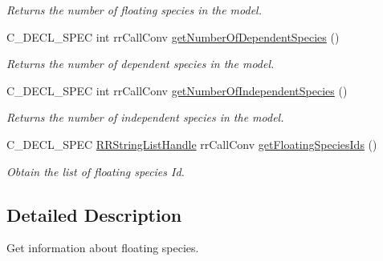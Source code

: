 \begin{DoxyCompactItemize}
\begin{DoxyCompactList}\small\item\em \-Returns the number of floating species in the model. \end{DoxyCompactList}\item 
\hypertarget{group__utility_ga7d573d16a02b3bf4361c00065f624e0b}{
\-C\-\_\-\-D\-E\-C\-L\-\_\-\-S\-P\-E\-C int rr\-Call\-Conv \hyperlink{group__utility_ga7d573d16a02b3bf4361c00065f624e0b}{get\-Number\-Of\-Dependent\-Species} ()}
\label{group__utility_ga7d573d16a02b3bf4361c00065f624e0b}

\begin{DoxyCompactList}\small\item\em \-Returns the number of dependent species in the model. \end{DoxyCompactList}\item 
\hypertarget{group__utility_ga29811c87b0f144e506c93373418fbe8b}{
\-C\-\_\-\-D\-E\-C\-L\-\_\-\-S\-P\-E\-C int rr\-Call\-Conv \hyperlink{group__utility_ga29811c87b0f144e506c93373418fbe8b}{get\-Number\-Of\-Independent\-Species} ()}
\label{group__utility_ga29811c87b0f144e506c93373418fbe8b}

\begin{DoxyCompactList}\small\item\em \-Returns the number of independent species in the model. \end{DoxyCompactList}\item 
\-C\-\_\-\-D\-E\-C\-L\-\_\-\-S\-P\-E\-C \hyperlink{rr__c__types_8h_abf561b014879247b7b92ee99c205de21}{\-R\-R\-String\-List\-Handle} \*
rr\-Call\-Conv \hyperlink{group__utility_ga6df4c12d297a9c93b4d33c754f0f1e19}{get\-Floating\-Species\-Ids} ()
\begin{DoxyCompactList}\small\item\em \-Obtain the list of floating species \-Id. \end{DoxyCompactList}\end{DoxyCompactItemize}


\subsection{\-Detailed \-Description}
\-Get information about floating species. 

